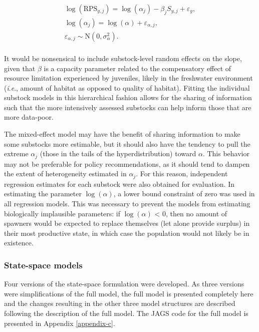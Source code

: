 \documentclass[12pt,]{book}
\theoremstyle{definition}
\theoremstyle{definition}
\theoremstyle{definition}
\theoremstyle{remark}
\begin{document}
\begin{equation}
  \begin{split}
    \log(\text{RPS}_{y,j})=\log(\alpha_j)-\beta_j S_{y,j} + \varepsilon_y, \\
    \log(\alpha_j)=\log(\alpha) + \varepsilon_{\alpha,j}, \\
    \varepsilon_{\alpha,j} \sim \text{N}(0,\sigma^2_{\alpha}). \\
  \end{split}
\label{eq:lin-ricker-mixed}
\end{equation}

\noindent
It would be nonsensical to include substock-level random effects on the
slope, given that \(\beta\) is a capacity parameter related to the
compensatory effect of resource limitation experienced by juveniles,
likely in the freshwater environment (\emph{i}.\emph{e}., amount of
habitat as opposed to quality of habitat). Fitting the individual
substock models in this hierarchical fashion allows for the sharing of
information such that the more intensively assessed substocks can help
inform those that are more data-poor.

The mixed-effect model may have the benefit of sharing information to
make some substocks more estimable, but it should also have the tendency
to pull the extreme \(\alpha_j\) (those in the tails of the
hyperdistribution) toward \(\alpha\). This behavior may not be
preferable for policy recommendations, as it should tend to dampen the
extent of heterogeneity estimated in \(\alpha_j\). For this reason,
independent regression estimates for each substock were also obtained
for evaluation. In estimating the parameter \(\log(\alpha)\), a lower
bound constraint of zero was used in all regression models. This was
necessary to prevent the models from estimating biologically implausible
parameters: if \(\log(\alpha)\) \textless{} 0, then no amount of
spawners would be expected to replace themselves (let alone provide
surplus) in their most productive state, in which case the population
would not likely be in existence.

\subsubsection{State-space models}\label{ssm-model}

\noindent
Four versions of the state-space formulation were developed. As three
versions were simplifications of the full model, the full model is
presented completely here and the changes resulting in the other three
model structures are described following the description of the full
model. The JAGS code for the full model is presented in Appendix
\ref{appendix-c}.
\end{document}
